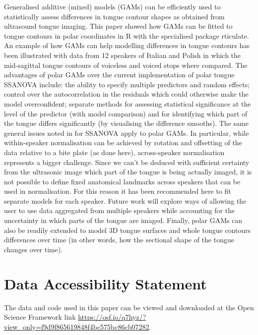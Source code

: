 \documentclass[11pt,]{article}
\begin{document}
Generalised additive (mixed) models (GAMs) can be efficiently used to
statistically assess differences in tongue contour shapes as obtained
from ultrasound tongue imaging. This paper showed how GAMs can be fitted
to tongue contours in polar coordinates in R with the specialised
package rticulate. An example of how GAMs can help modelling differences
in tongue contours has been illustrated with data from 12 speakers of
Italian and Polish in which the mid-sagittal tongue contours of
voiceless and voiced stops where compared. The advantages of polar GAMs
over the current implementation of polar tongue SSANOVA include: the
ability to specify multiple predictors and random effects; control over
the autocorrelation in the residuals which could otherwise make the
model overconfident; separate methods for assessing statistical
significance at the level of the predictor (with model comparison) and
for identifying which part of the tongue differs significantly (by
visualising the difference smooths). The same general issues noted in
\citet{davidson2006} for SSANOVA apply to polar GAMs. In particular,
while within-speaker normalisation can be achieved by rotation and
offsetting of the data relative to a bite plate (as done here),
across-speaker normalisation represents a bigger challenge. Since we
can't be deduced with sufficient certainty from the ultrasonic image
which part of the tongue is being actually imaged, it is not possible to
define fixed anatomical landmarks across speakers that can be used in
normalisation. For this reason it has been recommended here to fit
separate models for each speaker. Future work will explore ways of
allowing the user to use data aggregated from multiple speakers while
accounting for the uncertainty in which parts of the tongue are imaged.
Finally, polar GAMs can also be readily extended to model 3D tongue
surfaces and whole tongue contours differences over time (in other
words, how the sectional shape of the tongue changes over time).

\hypertarget{data-accessibility-statement}{%
\section{Data Accessibility
Statement}\label{data-accessibility-statement}}

The data and code used in this paper can be viewed and downloaded at the
Open Science Framework link
\url{https://osf.io/q7hyz/?view_only=f9d9f865619848f4bc575bc86cb07282}.


\end{document}
